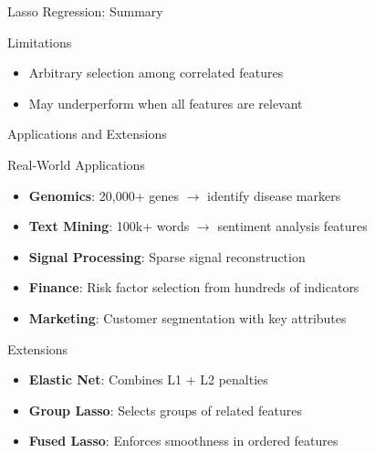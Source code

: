 \documentclass{beamer}
\begin{document}
\begin{frame}{Lasso Regression: Summary}
\begin{keypointsbox}{Limitations}
{\small
\begin{itemize}
\item Arbitrary selection among correlated features
\item May underperform when all features are relevant
\end{itemize}
}
\end{keypointsbox}
\end{frame}

\begin{frame}{Applications and Extensions}
\begin{examplebox}{Real-World Applications}
{\small
\begin{itemize}
\item \textbf{Genomics}: 20,000+ genes $\to$ identify disease markers
\item \textbf{Text Mining}: 100k+ words $\to$ sentiment analysis features
\item \textbf{Signal Processing}: Sparse signal reconstruction
\item \textbf{Finance}: Risk factor selection from hundreds of indicators
\item \textbf{Marketing}: Customer segmentation with key attributes
\end{itemize}
}
\end{examplebox}

\begin{keypointsbox}{Extensions}
{\small
\begin{itemize}
\item \textbf{Elastic Net}: Combines L1 + L2 penalties
\item \textbf{Group Lasso}: Selects groups of related features
\item \textbf{Fused Lasso}: Enforces smoothness in ordered features
\end{itemize}
}
\end{keypointsbox}
\end{frame}
\end{document}
